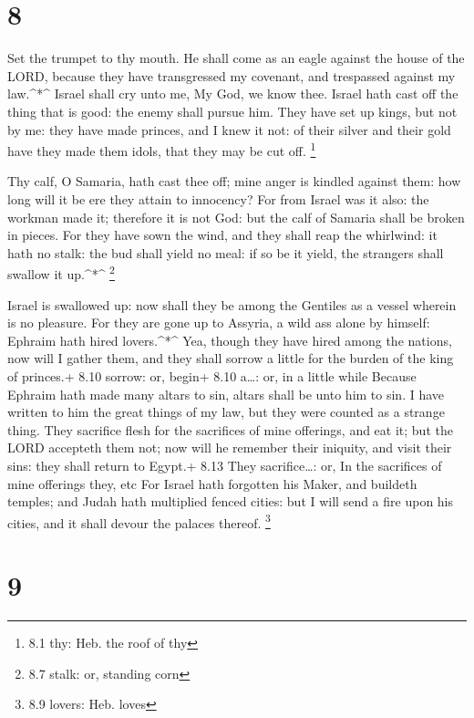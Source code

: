 \hypertarget{section-7}{%
\section{8}\label{section-7}}

 Set the trumpet to thy mouth. He shall come as an eagle
against the house of the LORD, because they have transgressed my
covenant, and trespassed against my law.\^{}*\^{}  Israel
shall cry unto me, My God, we know thee.  Israel hath cast
off the thing that is good: the enemy shall pursue him. 
They have set up kings, but not by me: they have made princes, and I
knew it not: of their silver and their gold have they made them idols,
that they may be cut off. \footnote{8.1 thy: Heb. the roof of thy}

 Thy calf, O Samaria, hath cast thee off; mine anger is
kindled against them: how long will it be ere they attain to innocency?
 For from Israel was it also: the workman made it; therefore
it is not God: but the calf of Samaria shall be broken in pieces.
 For they have sown the wind, and they shall reap the
whirlwind: it hath no stalk: the bud shall yield no meal: if so be it
yield, the strangers shall swallow it up.\^{}*\^{} \footnote{8.7 stalk:
  or, standing corn}

 Israel is swallowed up: now shall they be among the
Gentiles as a vessel wherein is no pleasure.  For they are
gone up to Assyria, a wild ass alone by himself: Ephraim hath hired
lovers.\^{}*\^{}  Yea, though they have hired among the
nations, now will I gather them, and they shall sorrow a little for the
burden of the king of princes.+ 8.10 sorrow: or, begin+ 8.10 a\ldots:
or, in a little while  Because Ephraim hath made many
altars to sin, altars shall be unto him to sin.  I have
written to him the great things of my law, but they were counted as a
strange thing.  They sacrifice flesh for the sacrifices of
mine offerings, and eat it; but the LORD accepteth them not; now will he
remember their iniquity, and visit their sins: they shall return to
Egypt.+ 8.13 They sacrifice\ldots: or, In the sacrifices of mine
offerings they, etc  For Israel hath forgotten his Maker,
and buildeth temples; and Judah hath multiplied fenced cities: but I
will send a fire upon his cities, and it shall devour the palaces
thereof. \footnote{8.9 lovers: Heb. loves}

\hypertarget{section-8}{%
\section{9}\label{section-8}}

